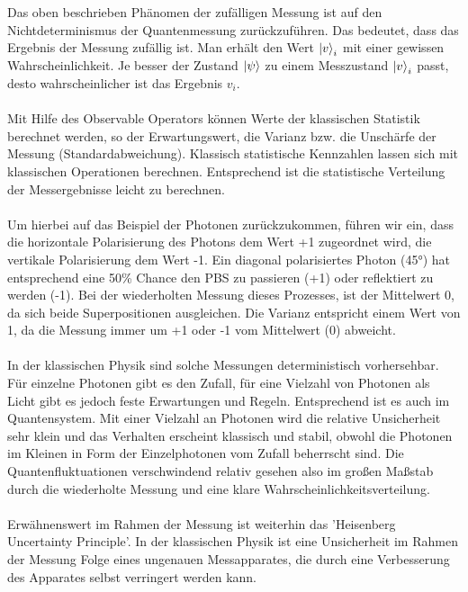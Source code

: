 Das oben beschrieben Phänomen der zufälligen Messung ist auf den Nichtdeterminismus der Quantenmessung zurückzuführen. Das bedeutet, dass das Ergebnis der Messung zufällig ist. Man erhält den Wert $\ket v_i$ mit einer gewissen Wahrscheinlichkeit.
Je besser der Zustand $\ket \psi$ zu einem Messzustand $\ket v_i$ passt, desto wahrscheinlicher ist das Ergebnis $v_i$. \\
\\
Mit Hilfe des Observable Operators können Werte der klassischen Statistik berechnet werden, so der Erwartungswert, die Varianz bzw. die Unschärfe der Messung (Standardabweichung). 
Klassisch statistische Kennzahlen lassen sich mit klassischen Operationen berechnen. Entsprechend ist die statistische Verteilung der Messergebnisse leicht zu berechnen. \\
\\ 
Um hierbei auf das Beispiel der Photonen zurückzukommen, führen wir ein, dass die horizontale Polarisierung des Photons dem Wert +1 zugeordnet wird, die vertikale Polarisierung dem Wert -1.
Ein diagonal polarisiertes Photon (45°) hat entsprechend eine 50\% Chance den PBS zu passieren (+1) oder reflektiert zu werden (-1). Bei der wiederholten Messung dieses Prozesses, ist der Mittelwert 0, da sich beide Superpositionen ausgleichen.
Die Varianz entspricht einem Wert von 1, da die Messung immer um +1 oder -1 vom Mittelwert (0) abweicht. \\
\\
In der klassischen Physik sind solche Messungen deterministisch vorhersehbar. Für einzelne Photonen gibt es den Zufall, für eine Vielzahl von Photonen als Licht gibt es jedoch feste Erwartungen und Regeln.
Entsprechend ist es auch im Quantensystem. Mit einer Vielzahl an Photonen wird die relative Unsicherheit sehr klein und das Verhalten erscheint klassisch und stabil, obwohl die Photonen im Kleinen in Form der Einzelphotonen vom Zufall beherrscht sind.
Die Quantenfluktuationen verschwindend relativ gesehen also im großen Maßstab durch die wiederholte Messung und eine klare Wahrscheinlichkeitsverteilung.
\cite{kasirajan_fundamentals_2021}
\\ \\
Erwähnenswert im Rahmen der Messung ist weiterhin das 'Heisenberg Uncertainty Principle'. In der klassischen Physik ist eine Unsicherheit im Rahmen der Messung Folge eines ungenauen Messapparates, die durch eine Verbesserung des Apparates selbst verringert werden kann. \\
